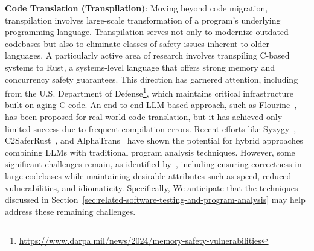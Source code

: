 

\textbf{Code Translation (Transpilation)}:
Moving beyond code migration, transpilation involves large-scale transformation of a program’s underlying programming language. 
Transpilation serves not only to modernize outdated codebases but also to eliminate classes of safety issues inherent to older languages. 
A particularly active area of research involves transpiling C-based systems to Rust, a systems-level language that offers strong memory and concurrency safety guarantees.
This direction has garnered attention, including from the U.S. Department of Defense\footnote{\url{https://www.darpa.mil/news/2024/memory-safety-vulnerabilities}}, which maintains critical infrastructure built on aging C code.
An end-to-end LLM-based approach, such as Flourine~\citep{eniser2024translatingrealworldcodellms}, has been proposed for real-world code translation, but it has achieved only limited success due to frequent compilation errors.
Recent efforts like Syzygy~\citep{shetty2024syzygy}, C2SaferRust~\citep{nitin2025c2saferrust}, and AlphaTrans~\citep{alphatrans} have shown the potential for hybrid approaches combining LLMs with traditional program analysis techniques. 
However, some significant challenges remain, as identified by~\citet{li2025translating}, including ensuring correctness in large codebases while maintaining desirable attributes such as speed, reduced vulnerabilities, and idiomaticity.
Specifically, 
We anticipate that the techniques discussed in Section~\ref{sec:related-software-testing-and-program-analysis} may help address these remaining challenges.


